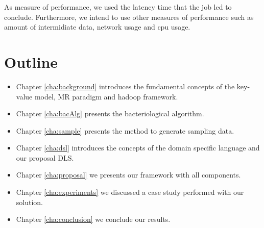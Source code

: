 As measure of performance, we used the latency time that the job led to conclude.
Furthermore, we intend to use other measures of performance such as amount of intermidiate data,
network usage and cpu usage.

\section{Outline}

\begin{itemize}
	\item Chapter \ref{cha:background} introduces the fundamental concepts of the
	key-value model, MR paradigm and hadoop framework.
    \item Chapter \ref{cha:bacAlg} presents the bacteriological algorithm.
    \item Chapter \ref{cha:sample} presents the method to generate sampling
    data.
    \item Chapter \ref{cha:dsl} introduces the concepts of the domain specific language
	and our proposal DLS.
	\item Chapter \ref{cha:proposal} we presents our framework with all components.
    \item Chapter \ref{cha:experiments} we discussed a case study performed with our solution.
	\item Chapter \ref{cha:conclusion} we conclude our results.
\end{itemize}




